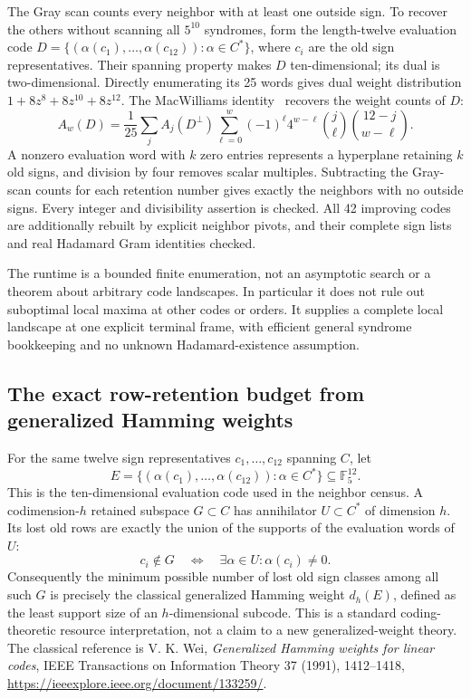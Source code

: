 \documentclass[11pt]{article}
\begin{document}
The Gray scan counts every neighbor with at least one outside sign.
To recover the others without scanning all $5^{10}$ syndromes, form
the length-twelve evaluation code
$D=\{(\alpha(c_1),\ldots,\alpha(c_{12})): \alpha\in C^*\}$,
where $c_i$ are the old sign representatives. Their spanning property
makes $D$ ten-dimensional; its dual is two-dimensional. Directly
enumerating its 25 words gives dual weight distribution
$1+8z^8+8z^{10}+8z^{12}$.
The MacWilliams identity~\cite{MW} recovers the weight counts of $D$:
\[
 A_w(D)=\frac1{25}\sum_j A_j(D^\perp)
 \sum_{\ell=0}^w(-1)^\ell4^{w-\ell}
       \binom j\ell\binom{12-j}{w-\ell}.
\]
A nonzero evaluation word with $k$ zero entries represents a
hyperplane retaining $k$ old signs, and division by four removes
scalar multiples. Subtracting the Gray-scan counts for each retention
number gives exactly the neighbors with no outside signs. Every
integer and divisibility assertion is checked. All 42 improving
codes are additionally rebuilt by explicit neighbor pivots, and
their complete sign lists and real Hadamard Gram identities checked.

The runtime is a bounded finite enumeration, not an asymptotic search
or a theorem about arbitrary code landscapes. In particular it does
not rule out suboptimal local maxima at other codes or orders.
It supplies a complete local landscape at one explicit terminal
frame, with efficient general syndrome bookkeeping and no unknown
Hadamard-existence assumption.
\subsection{The exact row-retention budget from generalized Hamming weights}
For the same twelve sign representatives $c_1,\ldots,c_{12}$ spanning
$C$, let
\[
 E=\{(\alpha(c_1),\ldots,\alpha(c_{12})): \alpha\in C^*\}
 \subseteq\mathbb F_5^{12}.
\]
This is the ten-dimensional evaluation code used in the neighbor
census. A codimension-$h$ retained subspace $G\subset C$ has
annihilator $U\subset C^*$ of dimension $h$. Its lost old rows are
exactly the union of the supports of the evaluation words of $U$:
\[
 c_i\notin G\quad\Longleftrightarrow\quad
 \exists\alpha\in U:\alpha(c_i)\ne0.
\]
Consequently the minimum possible number of lost old sign classes
among all such $G$ is precisely the classical generalized Hamming
weight $d_h(E)$, defined as the least support size of an
$h$-dimensional subcode. This is a standard coding-theoretic resource
interpretation, not a claim to a new generalized-weight theory.
The classical reference is V. K. Wei, \emph{Generalized Hamming weights
for linear codes}, IEEE Transactions on Information Theory 37 (1991),
1412--1418, \url{https://ieeexplore.ieee.org/document/133259/}.
\end{document}
